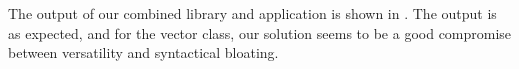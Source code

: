 The output of our combined library and application is shown in .
%
%
The output is as expected, and for the vector class, our solution seems to be a good compromise between versatility and syntactical bloating.


